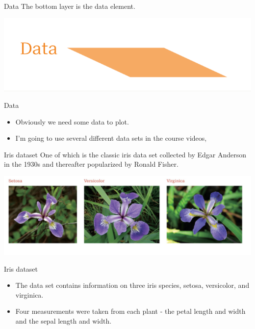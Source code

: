 \documentclass[
  ignorenonframetext,
]{beamer}
\begin{document}
\begin{frame}{Data}
\label{data}
The bottom layer is the data element.

\includegraphics{../images/im126.png}
\end{frame}

\begin{frame}{Data}
\label{data-1}
\begin{itemize}
\item
  Obviously we need some data to plot.
\item
  I'm going to use several different data sets in the course videos,
\end{itemize}
\end{frame}

\begin{frame}{Iris dataset}
\label{iris-dataset}
One of which is the classic iris data set collected by Edgar Anderson in
the 1930s and thereafter popularized by Ronald Fisher.

\includegraphics{../images/im127.png}
\end{frame}

\begin{frame}{Iris dataset}
\label{iris-dataset-1}
\begin{itemize}
\item
  The data set contains information on three iris species, setosa,
  versicolor, and virginica.
\item
  Four measurements were taken from each plant - the petal length and
  width and the sepal length and width.
\end{itemize}
\end{frame}
\end{document}
